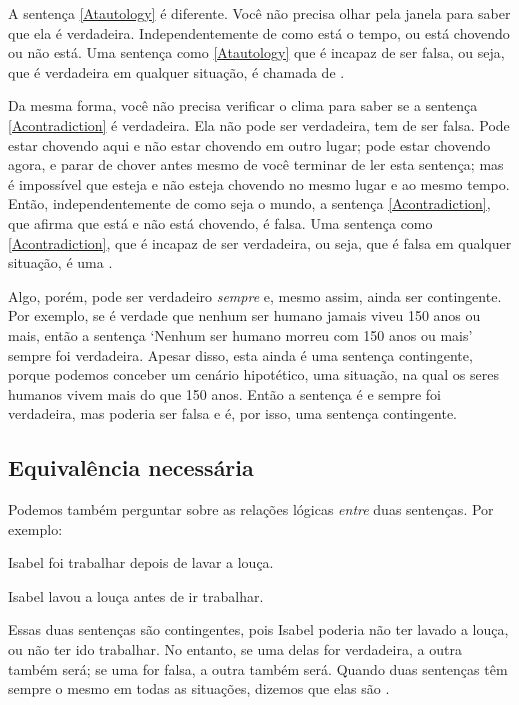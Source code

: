 A sentença \ref{Atautology} é diferente.
Você não precisa olhar pela janela para saber que ela é verdadeira. Independentemente de como está o tempo, ou está chovendo ou não está.
Uma sentença como \ref{Atautology} que é incapaz de ser falsa, ou seja, que é verdadeira em qualquer situação, é chamada de .

Da mesma forma, você não precisa verificar o clima para saber se a sentença \ref{Acontradiction} é verdadeira.
Ela não pode ser verdadeira, tem de ser falsa.
Pode estar chovendo aqui e não estar chovendo em outro lugar; pode estar chovendo agora, e parar de chover antes mesmo de você terminar de ler esta sentença; mas é impossível que esteja e não esteja chovendo no mesmo lugar e ao mesmo tempo.
Então, independentemente de como seja o mundo, a sentença \ref{Acontradiction}, que afirma que está e não está chovendo, é falsa.
Uma sentença como \ref{Acontradiction}, que é incapaz de ser verdadeira, ou seja, que é falsa em qualquer situação, é uma .

Algo, porém, pode ser verdadeiro \emph{sempre} e, mesmo assim, ainda ser contingente. Por exemplo, se é verdade que nenhum ser humano jamais viveu 150 anos ou mais, então a sentença `Nenhum ser humano morreu com 150 anos ou mais' sempre foi verdadeira.
Apesar disso, esta ainda é uma sentença contingente, porque podemos conceber um cenário hipotético, uma situação, na qual os seres humanos vivem mais do que 150 anos.
Então a sentença é e sempre foi verdadeira, mas poderia ser falsa e é, por isso, uma sentença contingente.

\subsection{Equivalência necessária}

Podemos também perguntar sobre as relações lógicas \emph{entre} duas sentenças.
Por exemplo:
\begin{earg}
\item[] Isabel foi trabalhar depois de lavar a louça.
\item[] Isabel lavou a louça antes de ir trabalhar.
\end{earg}
Essas duas sentenças são contingentes, pois Isabel poderia não ter lavado a louça, ou não ter ido trabalhar.
No entanto, se uma delas for verdadeira, a outra também será; se uma for falsa, a outra também será.
Quando duas sentenças têm sempre o mesmo  em todas as situações, dizemos que elas são .

